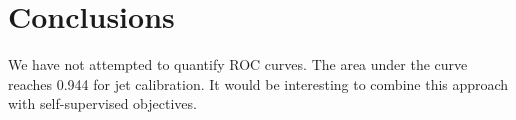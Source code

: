 \section{Conclusions}\label{sec:conclusions}

We have not attempted to quantify ROC curves. The area under the curve
reaches 0.944 for jet calibration. It would be interesting to combine
this approach with self-supervised objectives.

